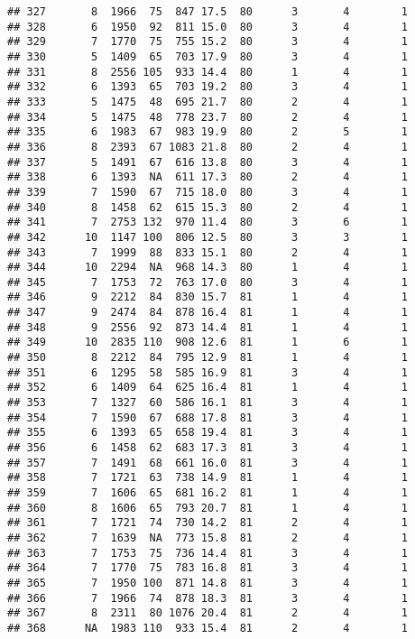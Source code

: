\documentclass{article}\usepackage[]{graphicx}\usepackage[]{color}
\makeatletter
\newenvironment{kframe}{%
 \def\at@end@of@kframe{}%
 \ifinner\ifhmode%
  \def\at@end@of@kframe{\end{minipage}}%
  \begin{minipage}{\columnwidth}%
 \fi\fi%
 \def\FrameCommand##1{\hskip\@totalleftmargin \hskip-\fboxsep
 \colorbox{shadecolor}{##1}\hskip-\fboxsep
     \hskip-\linewidth \hskip-\@totalleftmargin \hskip\columnwidth}%
 \MakeFramed {\advance\hsize-\width
   \@totalleftmargin\z@ \linewidth\hsize
   \@setminipage}}%
 {\par\unskip\endMakeFramed%
 \at@end@of@kframe}
\newenvironment{knitrout}{}{} %
\makeatother
\begin{document}
\begin{knitrout}
\begin{kframe}
\begin{verbatim}
## 327       8  1966  75  847 17.5  80      3       4        1
## 328       6  1950  92  811 15.0  80      3       4        1
## 329       7  1770  75  755 15.2  80      3       4        1
## 330       5  1409  65  703 17.9  80      3       4        1
## 331       8  2556 105  933 14.4  80      1       4        1
## 332       6  1393  65  703 19.2  80      3       4        1
## 333       5  1475  48  695 21.7  80      2       4        1
## 334       5  1475  48  778 23.7  80      2       4        1
## 335       6  1983  67  983 19.9  80      2       5        1
## 336       8  2393  67 1083 21.8  80      2       4        1
## 337       5  1491  67  616 13.8  80      3       4        1
## 338       6  1393  NA  611 17.3  80      2       4        1
## 339       7  1590  67  715 18.0  80      3       4        1
## 340       8  1458  62  615 15.3  80      2       4        1
## 341       7  2753 132  970 11.4  80      3       6        1
## 342      10  1147 100  806 12.5  80      3       3        1
## 343       7  1999  88  833 15.1  80      2       4        1
## 344      10  2294  NA  968 14.3  80      1       4        1
## 345       7  1753  72  763 17.0  80      3       4        1
## 346       9  2212  84  830 15.7  81      1       4        1
## 347       9  2474  84  878 16.4  81      1       4        1
## 348       9  2556  92  873 14.4  81      1       4        1
## 349      10  2835 110  908 12.6  81      1       6        1
## 350       8  2212  84  795 12.9  81      1       4        1
## 351       6  1295  58  585 16.9  81      3       4        1
## 352       6  1409  64  625 16.4  81      1       4        1
## 353       7  1327  60  586 16.1  81      3       4        1
## 354       7  1590  67  688 17.8  81      3       4        1
## 355       6  1393  65  658 19.4  81      3       4        1
## 356       6  1458  62  683 17.3  81      3       4        1
## 357       7  1491  68  661 16.0  81      3       4        1
## 358       7  1721  63  738 14.9  81      1       4        1
## 359       7  1606  65  681 16.2  81      1       4        1
## 360       8  1606  65  793 20.7  81      1       4        1
## 361       7  1721  74  730 14.2  81      2       4        1
## 362       7  1639  NA  773 15.8  81      2       4        1
## 363       7  1753  75  736 14.4  81      3       4        1
## 364       7  1770  75  783 16.8  81      3       4        1
## 365       7  1950 100  871 14.8  81      3       4        1
## 366       7  1966  74  878 18.3  81      3       4        1
## 367       8  2311  80 1076 20.4  81      2       4        1
## 368      NA  1983 110  933 15.4  81      2       4        1

\end{verbatim}
\end{kframe}
\end{knitrout}
\end{document}
